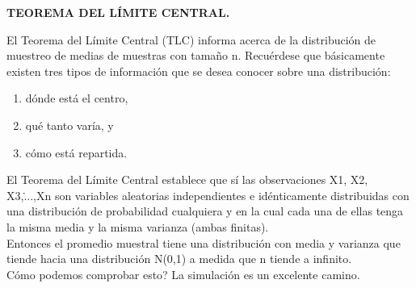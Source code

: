 \documentclass[12pt,letterpaper]{article}\usepackage[]{graphicx}\usepackage[]{color}
\begin{document}
\begin{center}
\textbf{TEOREMA DEL L\'IMITE CENTRAL.}
\end{center}
El Teorema del L\'imite Central (TLC) informa acerca de la distribuci\'on de muestreo de medias de muestras con tama\~no n. Recu\'erdese que b\'asicamente existen tres tipos de informaci\'on que se desea conocer sobre una distribuci\'on:
\begin{enumerate}
  \item d\'onde est\'a el centro,
  \item qu\'e tanto var\'ia, y
  \item c\'omo est\'a repartida.
\end{enumerate}

El Teorema del L\'imite Central establece que s\'i las observaciones X1, X2, X3,\....,Xn son variables aleatorias independientes e id\'enticamente distribuidas con una distribuci\'on de probabilidad cualquiera y en la cual cada una de ellas tenga la misma media y la misma varianza (ambas finitas).\\

Entonces el promedio muestral tiene una distribuci\'on con media y varianza que tiende hacia una distribuci\'on N(0,1) a medida que n tiende a infinito.\\

\¿C\'omo podemos comprobar esto? La simulaci\'on es un excelente camino.
\end{document}
